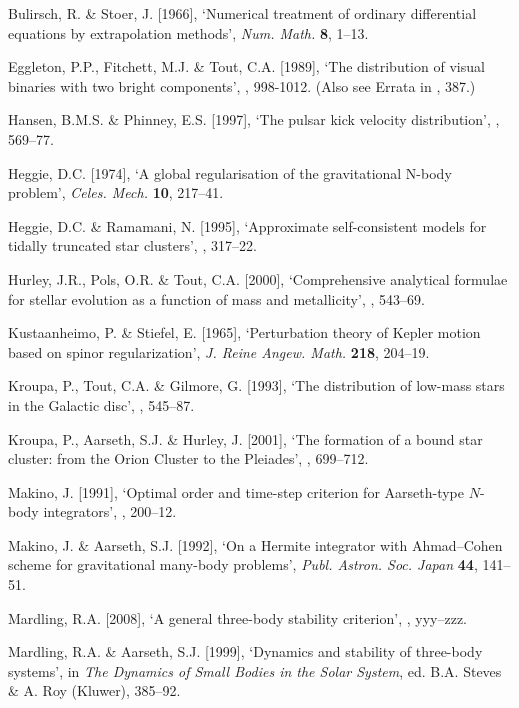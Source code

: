 \documentclass[12pt]{article}
\begin{document}
\medskip
\noindent
Bulirsch, R. \& Stoer, J. [1966], `Numerical treatment of ordinary differential
equations by extrapolation methods',
{\it Num. Math.} {\bf 8}, 1--13.

\medskip
\noindent
Eggleton, P.P., Fitchett, M.J. \& Tout, C.A. [1989], `The distribution of visual
binaries with two bright components',
, 998-1012. (Also see Errata in , 387.)

\medskip
\noindent
Hansen, B.M.S. \& Phinney, E.S. [1997], `The pulsar kick velocity distribution',
, 569--77.

\medskip
\noindent
Heggie, D.C. [1974], `A global regularisation of the gravitational N-body problem',
{\it Celes. Mech.} {\bf 10}, 217--41.

\medskip
\noindent
Heggie, D.C. \& Ramamani, N. [1995], `Approximate self-consistent models for
tidally truncated star clusters',
, 317--22.

\medskip
\noindent
Hurley, J.R., Pols, O.R. \& Tout, C.A. [2000], `Comprehensive analytical formulae
for stellar evolution as a function of mass and metallicity',
, 543--69.

\medskip
\noindent
Kustaanheimo, P. \& Stiefel, E. [1965], `Perturbation theory of Kepler motion
based on spinor regularization',
{\it J. Reine Angew. Math.} {\bf 218}, 204--19.

\medskip
\noindent
Kroupa, P., Tout, C.A. \& Gilmore, G. [1993], `The distribution of low-mass stars
in the Galactic disc',
, 545--87.

\medskip
\noindent
Kroupa, P., Aarseth, S.J. \& Hurley, J. [2001], `The formation of a bound star
cluster: from the Orion Cluster to the Pleiades', , 699--712.

\medskip
\noindent
Makino, J. [1991], `Optimal order and time-step criterion for Aarseth-type
$N$-body integrators', , 200--12.

\medskip
\noindent
Makino, J. \& Aarseth, S.J. [1992], `On a Hermite integrator with Ahmad--Cohen
scheme for gravitational many-body problems',
{\it Publ. Astron. Soc. Japan} {\bf 44}, 141--51.

\medskip
\noindent
Mardling, R.A. [2008], `A general three-body stability criterion', , yyy--zzz.

\medskip
\noindent
Mardling, R.A. \& Aarseth, S.J. [1999], `Dynamics and stability of three-body systems',
in {\it The Dynamics of Small Bodies in the Solar System}, ed. B.A. Steves \& A. Roy
(Kluwer), 385--92.
\end{document}
